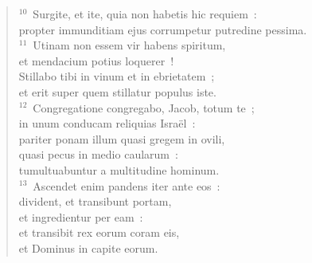 \begin{verse}
${}^{10}$~Surgite, et ite, quia non habetis hic requiem~:\\ propter immunditiam ejus corrumpetur putredine pessima.\\
${}^{11}$~Utinam non essem vir habens spiritum,\\ et mendacium potius loquerer~!\\ Stillabo tibi in vinum et in ebrietatem~;\\ et erit super quem stillatur populus iste.\\
${}^{12}$~Congregatione congregabo, Jacob, totum te~;\\ in unum conducam reliquias Isra\"el~:\\ pariter ponam illum quasi gregem in ovili,\\ quasi pecus in medio caularum~:\\ tumultuabuntur a multitudine hominum.\\
${}^{13}$~Ascendet enim pandens iter ante eos~:\\ divident, et transibunt portam,\\ et ingredientur per eam~:\\ et transibit rex eorum coram eis,\\ et Dominus in capite eorum.\end{verse}


